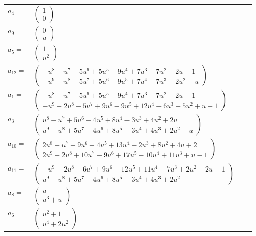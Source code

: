\documentclass[1p]{elsarticle_modified}
\theoremstyle{definition}
\begin{document}
\begin{tabular}{m{7pt} m{180pt} m{7pt} m{180pt} }
\flushright $a_{4}=$&$\begin{pmatrix}1\\0\end{pmatrix}$ \\
\flushright $a_{9}=$&$\begin{pmatrix}0\\u\end{pmatrix}$ \\
\flushright $a_{5}=$&$\begin{pmatrix}1\\u^2\end{pmatrix}$ \\
\flushright $a_{12}=$&$\begin{pmatrix}- u^8+u^7-5 u^6+5 u^5-9 u^4+7 u^3-7 u^2+2 u-1\\- u^9+u^8-5 u^7+5 u^6-9 u^5+7 u^4-7 u^3+2 u^2- u\end{pmatrix}$ \\
\flushright $a_{1}=$&$\begin{pmatrix}- u^8+u^7-5 u^6+5 u^5-9 u^4+7 u^3-7 u^2+2 u-1\\- u^9+2 u^8-5 u^7+9 u^6-9 u^5+12 u^4-6 u^3+5 u^2+u+1\end{pmatrix}$ \\
\flushright $a_{3}=$&$\begin{pmatrix}u^8- u^7+5 u^6-4 u^5+8 u^4-3 u^3+4 u^2+2 u\\u^9- u^8+5 u^7-4 u^6+8 u^5-3 u^4+4 u^3+2 u^2- u\end{pmatrix}$ \\
\flushright $a_{10}=$&$\begin{pmatrix}2 u^8- u^7+9 u^6-4 u^5+13 u^4-2 u^3+8 u^2+4 u+2\\2 u^9-2 u^8+10 u^7-9 u^6+17 u^5-10 u^4+11 u^3+u-1\end{pmatrix}$ \\
\flushright $a_{11}=$&$\begin{pmatrix}- u^9+2 u^8-6 u^7+9 u^6-12 u^5+11 u^4-7 u^3+2 u^2+2 u-1\\u^9- u^8+5 u^7-4 u^6+8 u^5-3 u^4+4 u^3+2 u^2\end{pmatrix}$ \\
\flushright $a_{8}=$&$\begin{pmatrix}u\\u^3+u\end{pmatrix}$ \\
\flushright $a_{6}=$&$\begin{pmatrix}u^2+1\\u^4+2 u^2\end{pmatrix}$ \\

\end{tabular}
\end{document}
